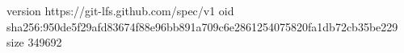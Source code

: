 version https://git-lfs.github.com/spec/v1
oid sha256:950de5f29afd83674f88e96bb891a709c6e2861254075820fa1db72cb35be229
size 349692
